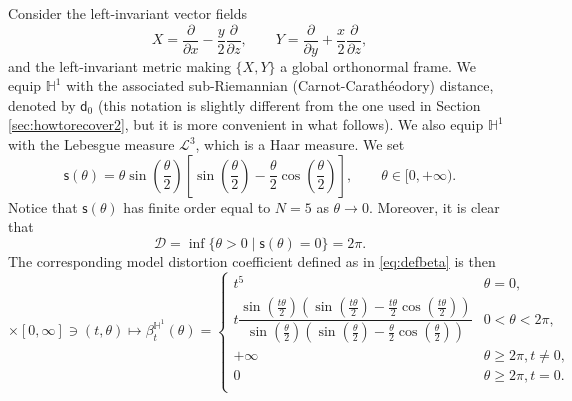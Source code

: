 \documentclass[11pt,a4paper]{article}
\theoremstyle{plain}
\theoremstyle{definition}
\theoremstyle{remark}
\numberwithin{equation}{section}
\newcommand{\cD}{\mathcal{D}}
\newcommand{\sfs}{\mathsf{s}}
\newcommand{\sfd}{\mathsf d}
\begin{document}
Consider the left-invariant vector fields 
\begin{equation}
X = \frac{\partial}{\partial x} -\frac{y}{2}\frac{\partial}{\partial z}, \qquad Y =\frac{\partial}{\partial y} + \frac{x}{2}\frac{\partial}{\partial z},
\end{equation}
and the left-invariant metric making $\{X,Y\}$ a global orthonormal frame. We equip $\mathbb{H}^{1}$ with the associated sub-Riemannian (Carnot-Carath\'eodory) distance, denoted by $\sfd_{0}$ (this notation is slightly different from the one used in Section \ref{sec:howtorecover2}, but it is more convenient in what follows). We also equip $\mathbb{H}^1$ with the Lebesgue measure $\mathscr{L}^{3}$, which is a Haar measure. We set
\begin{equation}
\sfs(\theta) =\theta \sin\left(\frac{\theta}{2}\right)\left[\sin\left(\frac{\theta}{2}\right)-\frac{\theta}{2} \cos\left(\frac{\theta}{2}\right)\right], \qquad \theta\in [0,+\infty).
\end{equation} 
Notice that $\sfs(\theta)$ has finite order equal to $N=5$ as $\theta \to 0$. Moreover, it is clear that
\begin{equation}
\cD=\inf\{\theta>0\mid \sfs(\theta)=0\}=2\pi.
\end{equation}
The corresponding model distortion coefficient defined as in \eqref{eq:defbeta} is then
\begin{equation}
[0,1]\times [0,\infty]\ni (t,\theta) \mapsto \beta^{\mathbb{H}^{1}}_t(\theta) =
\begin{cases}
 t^{5}\quad &\theta =0, \\
t\dfrac{ \sin\left(\frac{t\theta}{2}\right)\left(\sin\left(\frac{t\theta}{2}\right)-\frac{t\theta}{2} \cos\left(\frac{t\theta}{2}\right)\right)}{ \sin\left(\frac{\theta}{2}\right)\left(\sin\left(\frac{\theta}{2}\right)-\frac{\theta}{2} \cos\left(\frac{\theta}{2}\right)\right)}& 0<\theta <2\pi,\\
 +\infty & \theta \geq 2\pi, t\neq 0, \\
0 & \theta \geq 2\pi, t= 0. \\
 \end{cases}
\end{equation}
\end{document}
